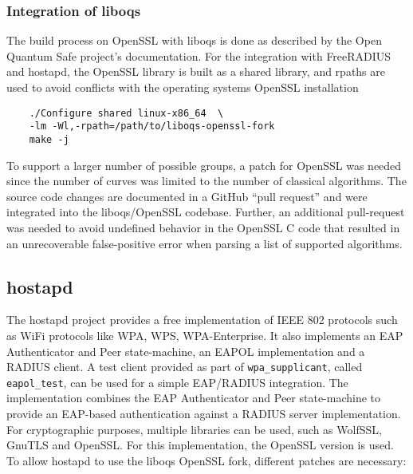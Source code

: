 \subsubsection{Integration of liboqs}

The build process on OpenSSL with liboqs is done as described by the Open Quantum Safe project's documentation. For the integration with FreeRADIUS and hostapd, the OpenSSL library is built as a shared library, and rpaths are used to avoid conflicts with the operating systems OpenSSL installation

\begin{lstlisting}
    ./Configure shared linux-x86_64  \
    -lm -Wl,-rpath=/path/to/liboqs-openssl-fork
    make -j
\end{lstlisting}

To support a larger number of possible groups, a patch for OpenSSL was needed since the number of curves was limited to the number of classical algorithms. The source code changes are documented in a GitHub ``pull request'' and were integrated into the liboqs/OpenSSL codebase. Further, an additional pull-request was needed to avoid undefined behavior in the OpenSSL C code that resulted in an unrecoverable false-positive error when parsing a list of supported algorithms.

\subsection{hostapd}

The hostapd project provides a free implementation of IEEE 802 protocols such as WiFi protocols like WPA, WPS, WPA-Enterprise. It also implements an \ac{EAP} Authenticator and Peer state-machine, an EAPOL implementation and a RADIUS client. A test client provided as part of \texttt{wpa\_supplicant}, called \texttt{eapol\_test}, can be used for a simple EAP/RADIUS integration. The implementation combines the \ac{EAP} Authenticator and Peer state-machine to provide an EAP-based authentication against a RADIUS server implementation. For cryptographic purposes, multiple libraries can be used, such as WolfSSL, GnuTLS and OpenSSL. For this implementation, the OpenSSL version is used. To allow hostapd to use the liboqs OpenSSL fork, different patches are necessary:

